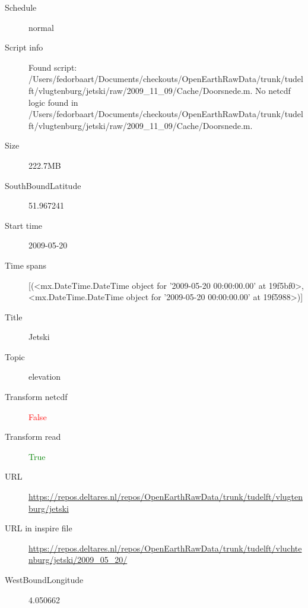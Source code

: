\documentclass[9]{report}
\begin{document}
\begin{description}
\begin{verbatim}
\end{verbatim}
  \item[Schedule] normal
  \item[Script info] Found script: /Users/fedorbaart/Documents/checkouts/OpenEarthRawData/trunk/tudelft/vlugtenburg/jetski/raw/2009\_11\_09/Cache/Doorsnede.m.
No netcdf logic found in /Users/fedorbaart/Documents/checkouts/OpenEarthRawData/trunk/tudelft/vlugtenburg/jetski/raw/2009\_11\_09/Cache/Doorsnede.m.
  \item[Size] 222.7MB
  \item[SouthBoundLatitude] 51.967241
  \item[Start time] 2009-05-20
  \item[Time spans] [(<mx.DateTime.DateTime object for '2009-05-20 00:00:00.00' at 19f5bf0>, <mx.DateTime.DateTime object for '2009-05-20 00:00:00.00' at 19f5988>)]
  \item[Title]  Jetski 
  \item[Topic] elevation
  \item[Transform netcdf] \textcolor{red}{False}
  \item[Transform read] \textcolor{green}{True}
  \item[URL] \href{https://repos.deltares.nl/repos/OpenEarthRawData/trunk/tudelft/vlugtenburg/jetski}{https://repos.deltares.nl/repos/OpenEarthRawData/trunk/tudelft/vlugtenburg/jetski}
  \item[URL in inspire file] \href{https://repos.deltares.nl/repos/OpenEarthRawData/trunk/tudelft/vluchtenburg/jetski/2009\_05\_20/}{https://repos.deltares.nl/repos/OpenEarthRawData/trunk/tudelft/vluchtenburg/jetski/2009\_05\_20/}
  \item[WestBoundLongitude] 4.050662
\end{description}
\end{document}
